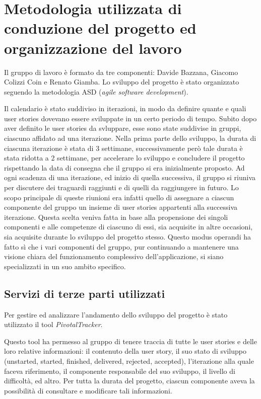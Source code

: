 \section{Metodologia utilizzata di conduzione del progetto ed organizzazione del lavoro}

Il gruppo di lavoro è formato da tre componenti: Davide Bazzana,
Giacomo Colizzi Coin e Renato Giamba.
\newline
\newline
Lo sviluppo del progetto è stato organizzato seguendo la metodologia
ASD (\textit{agile software development}).

Il calendario è stato suddiviso in iterazioni, in modo da definire
quante e quali user stories dovevano essere sviluppate in un certo
periodo di tempo. Subito dopo aver definito le user stories da
svluppare, esse sono state suddivise in gruppi, ciascuno affidato ad
una iterazione. Nella prima parte dello sviluppo, la durata di
ciascuna iterazione è stata di 3 settimane, successivamente però tale
durata è stata ridotta a 2 settimane, per accelerare lo sviluppo e
concludere il progetto rispettando la data di consegna che il gruppo
si era inizialmente proposto.  Ad ogni scadenza di una iterazione, ed
inizio di quella successiva, il gruppo si riuniva per discutere dei
traguardi raggiunti e di quelli da raggiungere in futuro. Lo scopo
principale di queste riunioni era infatti quello di assegnare a
ciascun componente del gruppo un insieme di user stories appartenti
alla successiva iterazione.  Questa scelta veniva fatta in base alla
propensione dei singoli componenti e alle competenze di ciascuno di
essi, sia acquisite in altre occasioni, sia acquisite durante lo
sviluppo del progetto stesso. Questo modus operandi ha fatto sì che i
vari componenti del gruppo, pur continuando a mantenere una visione
chiara del funzionamento complessivo dell'applicazione, si siano
specializzati in un suo ambito specifico.

\subsection{Servizi di terze parti utilizzati}

Per gestire ed analizzare l'andamento dello sviluppo del progetto è
stato utilizzato il tool \textit{PivotalTracker}.

Questo tool ha permesso al gruppo di tenere traccia di tutte le user
stories e delle loro relative informazioni: il contenuto della user
story, il suo stato di sviluppo (unstarted, started, finished, delivered,
rejected, accepted), l'iterazione alla quale faceva riferimento, il
componente responsabile del suo sviluppo, il livello di difficoltà, ed
altro. Per tutta la durata del progetto, ciascun componente aveva la
possibilità di consultare e modificare tali informazioni.

